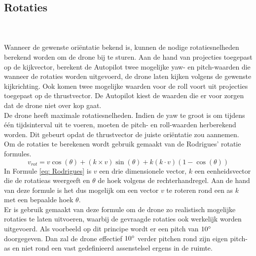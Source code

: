 \subsection{Rotaties}
\\\\
Wanneer de gewenste ori\"entatie bekend is, kunnen de nodige rotatiesnelheden berekend worden om de drone bij te sturen. Aan de hand van projecties toegepast op de kijkvector, berekent de Autopilot twee mogelijke yaw- en pitch-waarden die wanneer de rotaties worden uitgevoerd, de drone laten kijken volgens de gewenste kijkrichting. Ook komen twee mogelijke waarden voor de roll voort uit projecties toegepast op de thrustvector. De Autopilot kiest de waarden die er voor zorgen dat de drone niet over kop gaat.
\\
De drone heeft maximale rotatiesnelheden. Indien de yaw te groot is om tijdens \'e\'en tijdsinterval uit te voeren, moeten de pitch- en roll-waarden herberekend worden. Dit gebeurt opdat de thrustvector de juiste ori\"entatie zou aannemen.\\
Om de rotaties te berekenen wordt gebruik gemaakt van de Rodrigues'\cite{website:Rodrigues} rotatie formules.
\begin{equation} \label{eq: Rodrigues}
v_{rot} = v \cos(\theta) + (k \times v) \sin(\theta) + k(k \cdot v)(1-\cos(\theta))
\end{equation}
In Formule \ref{eq: Rodrigues} is \(v\) een drie dimensionele vector, \(k\) een eenheidsvector die de rotatieas weergeeft en \(\theta\) de hoek volgens de rechterhandregel. Aan de hand van deze formule is het dus mogelijk om een vector \(v\) te roteren rond een as \(k\) met een bepaalde hoek \(\theta\).\\
Er is gebruik gemaakt van deze formule om de drone zo realistisch mogelijke rotaties te laten uitvoeren, waarbij de gevraagde rotaties ook werkelijk worden uitgevoerd. Als voorbeeld op dit principe wordt er een pitch van \(10\degree\) doorgegeven. Dan zal de drone effectief \(10\degree\) verder pitchen rond zijn eigen pitch-as en niet rond een vast gedefinieerd assenstelsel ergens in de ruimte.
